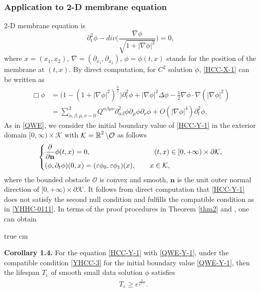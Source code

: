 \documentclass[11pt,twoside]{article}
\def\cK{\mathcal K}
\def\cO{\mathcal O}
\def\R{\mathop{\mathbb R\kern 0pt}\nolimits}
\def\ds{\displaystyle}
\def\f{\frac}
\def\p{\partial}
\def\ve{\varepsilon}
\def\bn{\mathbf{n}}
\theoremstyle{plain}
\theoremstyle{definition}
\numberwithin{equation}{section}
\begin{document}
\subsubsection{Application to 2-D membrane equation}

2-D membrane equation is
\begin{equation}\label{HCC-X-1}
\p_t^2\phi-div\big(\ds\f{\nabla\phi}{\sqrt{1+|\nabla\phi|^2}}\big)=0,
\end{equation}
where $x=(x_1,x_2)$, $\nabla=(\p_{x_1}, \p_{x_2})$, $\phi=\phi(t,x)$ stands for the position of the membrane at $(t,x)$.
By direct computation, for $C^2$ solution $\phi$, \eqref{HCC-X-1}
can be written as
\begin{equation}\label{HCC-Y-1}
\begin{split}
\Box\phi&=\big(1-(1+|\nabla\phi|^2)^{\f32}\big)\p_t^2\phi+|\nabla\phi|^2\Delta\phi
-\f12\nabla\phi\cdot\nabla(|\nabla\phi|^2)\\
&=\sum_{\alpha,\beta,\mu,\nu=0}^2Q^{\alpha\beta\mu\nu}\p^2_{\alpha\beta}\phi\p_{\mu}\phi\p_{\nu}\phi+O(|\nabla\phi|^4)\p_t^2\phi.
\end{split}
\end{equation}
As in \eqref{QWE}, we consider the initial boundary value of \eqref{HCC-Y-1} in the exterior domain $[0,\infty)\times\cK$ with
$\cK=\R^2\setminus\cO$ as follows
\begin{equation}\label{QWE-Y-1}
\left\{
\begin{aligned}
&\frac{\p}{\p\bn}\phi(t,x)=0,\hspace{3.2cm} (t,x)\in[0,+\infty)\times\p\cK,\\
&(\phi,\p_t\phi)(0,x)=(\ve \phi_0,\ve \phi_1)(x),\qquad x\in\cK,
\end{aligned}
\right.
\end{equation}
where the bounded obstacle $\cO$ is convex and smooth, $\bn$ is the unit outer normal direction of $[0,+\infty)\times \p\cK$.
It follows from direct computation that \eqref{HCC-Y-1} does not satisfy the second null condition and fulfills
the compatible condition as in \eqref{YHHC-0111}. In terms of the proof procedures in Theorem \ref{thm2} and
\cite{HouYinYuan26}, one can obtain

 true cm

{\bf Corollary 1.4.} For the equation \eqref{HCC-Y-1} with \eqref{QWE-Y-1}, under the compatible condition \eqref{YHCC-3}
for the initial boundary value \eqref{QWE-Y-1},
then the lifespan $T_{\ve}$ of smooth small data solution $\phi$ satisfies
\begin{equation}\label{YHCC0-2-1}
\begin{split}
&T_\ve\ge e^{\frac{1}{\ve^{2-}}}.\\
\end{split}
\end{equation}
\end{document}
